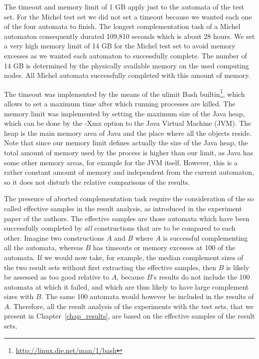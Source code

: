 The timeout and memory limit of 1 GB apply just to the automata of the \goal{} test set. For the Michel test set we did not set a timeout because we wanted each one of the four automata to finish. The longest complementation task of a Michel automaton consequently durated 109,810 seconds which is about 28 hours. We set a very high memory limit of 14 GB for the Michel test set to avoid memory excesses as we wanted each automaton to successfully complete. The number of 14 GB is determined by the physically available memory on the used computing nodes. All Michel automata successfully completed with this amount of memory.

The timeout was implemented by the means of the \textsf{ulimit} Bash builtin\footnote{\url{http://linux.die.net/man/1/bash}}, which allows to set a maximum time after which running processes are killed. The memory limit was implemented by setting the maximum size of the Java heap, which can be done by the \textsf{-Xmx} option to the Java Virtual Machine (JVM). The heap is the main memory area of Java and the place where all the objects reside. Note that since our memory limit defines actually the size of the Java heap, the total amount of memory used by the process is higher than our limit, as Java has some other memory areas, for example for the JVM itself. However, this is a rather constant amount of memory and independent from the current automaton, so it does not disturb the relative comparisons of the results.

The presence of aborted complementation task require the consideration of the so called effective samples in the result analysis, as introduced in the experiment paper of the \goal{} authors. The effective samples are those automata which have been successfully completed by \textit{all} constructions that are to be compared to each other. Imagine two constructions $A$ and $B$ where $A$ is successful complementing all the automata, whereas $B$ has timeouts or memory excesses at 100 of the automata. If we would now take, for example, the median complement sizes of the two result sets without first extracting the effective samples, then $B$ is likely be assessed as too good relative to $A$, because $B$'s results do not include the 100 automata at which it failed, and which are thus likely to have large complement sizes with $B$. The same 100 automata would however be included in the results of $A$. Therefore, all the result analysis of the experiments with the \goal{} test sets, that we present in Chapter~\ref{chap_results}, are based on the effective samples of the result sets. 


